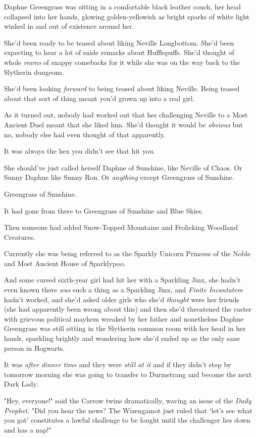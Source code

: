 Daphne Greengrass was sitting in a comfortable black leather couch, her head
collapsed into her hands, glowing golden-yellowish as bright sparks of white
light winked in and out of existence around her.

She'd been ready to be teased about liking Neville Longbottom. She'd been
expecting to hear a lot of snide remarks about Hufflepuffs. She'd thought of
whole \emph{reams} of snappy comebacks for it while she was on the way back to
the Slytherin dungeons.

She'd been looking \emph{forward} to being teased about liking Neville. Being
teased about that sort of thing meant you'd grown up into a real girl.

As it turned out, nobody had worked out that her challenging Neville to a Most
Ancient Duel meant that she liked him. She'd thought it would be \emph{obvious}
but no, nobody else had even thought of that apparently.

It was always the hex you didn't see that hit you.

She should've just called herself Daphne of Sunshine, like Neville of Chaos. Or
Sunny Daphne like Sunny Ron. Or \emph{anything} except Greengrass of Sunshine.

Greengrass of Sunshine.

It had gone from there to Greengrass of Sunshine and Blue Skies.

Then someone had added Snow-Topped Mountains and Frolicking Woodland Creatures.

Currently she was being referred to as the Sparkly Unicorn Princess of the
Noble and Most Ancient House of Sparklypoo.

And some cursed sixth-year girl had hit her with a Sparkling Jinx, she hadn't
even known there \emph{was} such a thing as a Sparkling Jinx, and \emph{Finite
Incantatem} hadn't worked, and she'd asked older girls who she'd \emph{thought}
were her friends (she had apparently been wrong about this) and then she'd
threatened the caster with grievous political mayhem wreaked by her father and
nonetheless Daphne Greengrass was still sitting in the Slytherin common room
with her head in her hands, sparkling brightly and wondering how she'd ended up
as the only sane person in Hogwarts.

It was \emph{after dinner time} and they were \emph{still at it} and if they
didn't stop by tomorrow morning she was going to transfer to Durmstrang and
become the next Dark Lady.

"Hey, everyone!" said the Carrow twins dramatically, waving an issue of the
\emph{Daily Prophet.} "Did you hear the news? The Wizengamot just ruled that
`let's see what you got' constitutes a lawful challenge to be fought until the
challenger lies down and has a nap!"

